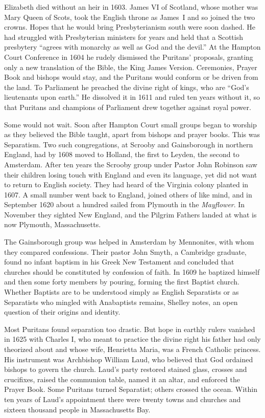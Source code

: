 Elizabeth died without an heir in 1603. James VI of Scotland, whose mother was Mary Queen of Scots, took the English throne as James~I and so joined the two crowns. Hopes that he would bring Presbyterianism south were soon
dashed. He had struggled with Presbyterian ministers for years and held that a Scottish presbytery
``agrees with monarchy as well as God and the devil.'' At the Hampton Court Conference in 1604 he
rudely dismissed the Puritans' proposals, granting only a new translation of the Bible, the King
James Version. Ceremonies, Prayer Book and bishops would stay, and the Puritans would conform or be
driven from the land. To Parliament he preached the divine right of kings, who are ``God's
lieutenants upon earth.'' He dissolved it in 1611 and ruled ten years without it, so that Puritans
and champions of Parliament drew together against royal power.

Some would not wait. Soon after Hampton Court small groups began to worship as they believed the
Bible taught, apart from bishops and prayer books. This was Separatism. Two such congregations, at
Scrooby and Gainsborough in northern England, had by 1608 moved to Holland, the first to Leyden, the
second to Amsterdam. After ten years the Scrooby group under Pastor John Robinson saw their children
losing touch with England and even its language, yet did not want to return to English society. They
had heard of the Virginia colony planted in 1607. A small number went back to England, joined others
of like mind, and in September 1620 about a hundred sailed from Plymouth in the \emph{Mayflower}. In
November they sighted New England, and the Pilgrim Fathers landed at what is now Plymouth,
Massachusetts.

The Gainsborough group was helped in Amsterdam by Mennonites, with whom they compared confessions.
Their pastor John Smyth, a Cambridge graduate, found no infant baptism in his Greek New Testament
and concluded that churches should be constituted by confession of faith. In 1609 he baptized
himself and then some forty members by pouring, forming the first Baptist church. Whether Baptists
are to be understood simply as English Separatists or as Separatists who mingled with Anabaptists
remains, Shelley notes, an open question of their origins and identity.

Most Puritans found separation too drastic. But hope in earthly rulers vanished in 1625 with Charles
I, who meant to practice the divine right his father had only theorized about and whose wife,
Henrietta Maria, was a French Catholic princess. His instrument was Archbishop William Laud, who
believed that God ordained bishops to govern the church. Laud's party restored stained glass, crosses
and crucifixes, raised the communion table, named it an altar, and enforced the Prayer Book.
Some Puritans turned Separatist; others crossed the ocean. Within ten years of Laud's appointment
there were twenty towns and churches and sixteen thousand people in Massachusetts Bay.

